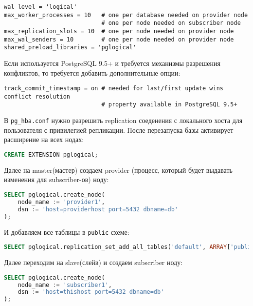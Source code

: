 \begin{lstlisting}[label=lst:pglogical1,caption=postgresql.conf]
wal_level = 'logical'
max_worker_processes = 10   # one per database needed on provider node
                            # one per node needed on subscriber node
max_replication_slots = 10  # one per node needed on provider node
max_wal_senders = 10        # one per node needed on provider node
shared_preload_libraries = 'pglogical'
\end{lstlisting}

Если используется PostgreSQL 9.5+ и требуется механизмы разрешения конфликтов, то требуется добавить дополнительные опции:

\begin{lstlisting}[label=lst:pglogical2,caption=postgresql.conf]
track_commit_timestamp = on # needed for last/first update wins conflict resolution
                            # property available in PostgreSQL 9.5+
\end{lstlisting}

В \lstinline!pg_hba.conf! нужно разрешить replication соеденения с локального хоста для пользователя с привилегией репликации. После перезапуска базы активирует расширение на всех нодах:

\begin{lstlisting}[label=lst:pglogical3,language=SQL,caption=Активируем расширение]
CREATE EXTENSION pglogical;
\end{lstlisting}

Далее на master(мастер) создаем provider (процесс, который будет выдавать изменения для subscriber-ов) ноду:

\begin{lstlisting}[label=lst:pglogical4,language=SQL,caption=Создаем provider]
SELECT pglogical.create_node(
    node_name := 'provider1',
    dsn := 'host=providerhost port=5432 dbname=db'
);
\end{lstlisting}

И добавляем все таблицы в \lstinline!public! схеме:

\begin{lstlisting}[label=lst:pglogical5,language=SQL,caption=Добавляем в replication set все таблицы в public схеме]
SELECT pglogical.replication_set_add_all_tables('default', ARRAY['public']);
\end{lstlisting}

Далее переходим на slave(слейв) и создаем subscriber ноду:

\begin{lstlisting}[label=lst:pglogical6,language=SQL,caption=Создаем subscriber]
SELECT pglogical.create_node(
    node_name := 'subscriber1',
    dsn := 'host=thishost port=5432 dbname=db'
);
\end{lstlisting}

